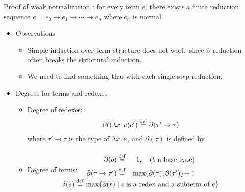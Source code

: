 \documentclass[paper=screen,mode=present,style=zysimple]{powerdot}
\begin{document}
\begin{slide}{Proof of weak normalization}
: for every term $e$, there exists a finite reduction sequence 
$e = e_0 \to e_1 \to \cdots \to e_n$ where $e_n$ is normal.
\vspace*{-0.5em}
\begin{itemize}
\item Observations
\vspace*{-0.5em}
\begin{itemize}
\item Simple induction over term structure does not work, since $\beta$-reduction often 
  breaks the structural induction. 
\item We need to find something that  with each single-step reduction.
\vspace*{-0.8em}
\end{itemize}
\item Degrees for terms and redexes
\vspace*{-0.5em}
\begin{itemize}
\item Degree of redexes: \vspace*{-1.2em}
\[
\partial ((\lambda x \ldot e) e') \defeq \partial (\tau' \to \tau)
\vspace*{-0.8em}
\]
where $\tau' \to \tau$ is the type of $\lambda x \, . \, e$, and $\partial (\tau) $ is defined by
\vspace*{-0.8em}
\begin{eqnarray*}
\partial(b) & \stackrel{\mathrm{def}}{=} & 1, \quad \mbox{($b$ a base type)} 
\\
\partial(\tau \to \tau') & \stackrel{\mathrm{def}}{=} & \max(\partial(\tau), \partial(\tau')) + 1 
\\[-3.8em]
\end{eqnarray*}
\item Degree of terms: \vspace*{-0.8em}
\[
\delta(e) \stackrel{\mathrm{def}}{=} \max \{{\partial(r) \mid \mbox{$e$ is a redex and a subterm of $e$}}\}
\]
\end{itemize}
\end{itemize}
\end{slide}
\end{document}
